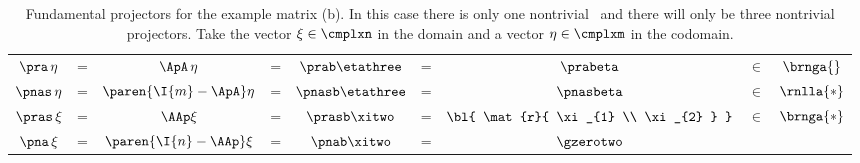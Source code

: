 \clearpage
\begin{landscape}
\thispagestyle{empty}
\begin{table}[htdp]
\caption[Fundamental projectors for the example matrix (b)]{Fundamental projectors for the example matrix (b).  In this case there is only one nontrivial \ns \ and there will only be three nontrivial projectors. Take the vector $\xi\in\cmplxn$ in the domain and a vector $\eta\in\cmplxm$ in the codomain.}
\begin{center}
\begin{tabular}{ccccccccc}
%
  $\pra \,  \eta$ &=& $\ApA \, \eta$ &=& $\prab \etathree$ &=& $\prabeta$ & $\in$ & $\brnga{}$ \\
%
  $\pnas \, \eta$ &=& $\paren{\I{m} - \ApA} \eta$ &=& $\pnasb \etathree$ &=& $\pnasbeta$ & $\in$ & $\rnlla{*}$ \\[25pt]
%
  $\pras \,  \xi$  &=& $\AAp \xi$ &=& $\prasb \xitwo$ &=& 
  ${\bl{ 
   \mat{r}{  \xi_{1} \\ 
             \xi_{2} } }}$ & $\in$ & $\brnga{*}$ \\
%
  $\pna \,   \xi$ &=& $\paren{\I{n} - \AAp} \xi$ &=& $\pnab \xitwo$ &=& 
  $\gzerotwo$
%
\end{tabular}
\end{center}
\label{tab:projectors:(b)}
\end{table}
\end{landscape}

\endinput
